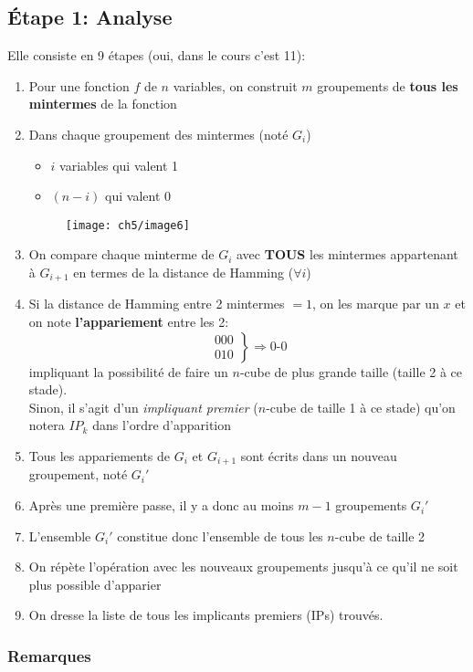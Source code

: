 \subsection{Étape 1: Analyse}
Elle consiste en 9 étapes (oui, dans le cours c'est 11):
\begin{enumerate}
	\item Pour une fonction $f$ de $n$ variables, on construit $m$ groupements de \textbf{tous les mintermes} de la fonction
	\item Dans chaque groupement des mintermes (noté $G_i$)
	\begin{itemize}
		\item $i$ variables qui valent 1
		\item $(n-i)$ qui valent 0
	\end{itemize}
	\begin{figure}[H]
		\centering
		\texttt{[image: ch5/image6]}
	\end{figure}
	\item On compare chaque minterme de $G_i$ avec \textbf{TOUS} les mintermes appartenant à $G_{i+1}$ en termes de la distance de Hamming ($\forall i$)
	\item Si la distance de Hamming entre 2 mintermes $=1$, on les marque par un $x$  et on note \textbf{l'appariement} entre les 2:
	\begin{equation}
		\left.
			\begin{array}{r}
				000\\
				010
			\end{array}
		\right\}\Rightarrow 0\text{-}0
	\end{equation}
	impliquant la possibilité de faire un $n$-cube de plus grande taille (taille 2 à ce stade).\\
	Sinon, il s'agit d'un \textit{impliquant premier} ($n$-cube de taille 1 à ce stade) qu'on notera $IP_k$ dans l'ordre d'apparition
	\item Tous les appariements de $G_i$ et $G_{i+1}$ sont écrits dans un nouveau groupement, noté $G_i'$
	\item Après une première passe, il y a donc au moins $m-1$ groupements $G_i'$
	\item L'ensemble $G_i'$ constitue donc l'ensemble de tous les $n$-cube de taille 2
	\item On répète l'opération avec les nouveaux groupements jusqu'à ce qu'il ne soit plus possible d'apparier
	\item On dresse la liste de tous les implicants premiers (IPs) trouvés.
\end{enumerate}
\subsubsection{Remarques}